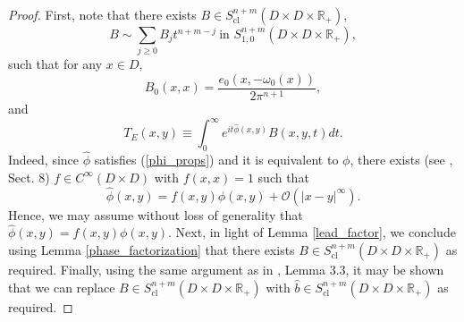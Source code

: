 \documentclass{article}
\newcommand{\RR}{\mathbb R}
\newcommand{\mco}{\mathcal O}
\DeclareMathOperator{\cl}{cl}
\begin{document}
% 
\begin{proof}
First, note that there exists $B \in S^{n+m}_{\cl}(D \times D \times \RR_+)$, $$B \sim \sum_{j \ge 0} B_j t^{n+m-j}\ \text{in } S^{n+m}_{1,0}(D \times D \times \RR_+),$$
such that for any $x \in D$, $$B_0(x,x) = \frac{e_0(x, -\omega_0(x))}{2\pi^{n+1}},$$
and $$T_E(x,y) \equiv \int_0^\infty e^{it \hat \phi(x,y)} B(x,y,t) dt.$$
Indeed, since $\hat \phi$ satisfies (\ref{phi_props}) and it is equivalent to $\phi$, there exists (see \cite{hsiaomari2}, Sect. 8) $f \in C^\infty(D \times D)$ with $f(x,x) = 1$ such that $$\hat \phi(x,y) = f(x,y) \phi(x,y) + \mco(|x-y|^\infty).$$ Hence, we may assume without loss of generality that $\hat \phi(x,y) = f(x,y) \phi(x,y)$. Next, in light of Lemma \ref{lead_factor}, we conclude using Lemma \ref{phase_factorization} that there exists $B \in S^{n+m}_{\cl}(D \times D \times \RR_+)$ as required. Finally, using the same argument as in \cite{hsiao_shen}, Lemma 3.3, it may be shown that we can replace $B \in S^{n+m}_{\cl}(D \times D \times \RR_+)$ with $\hat b \in S^{n+m}_{\cl}(D \times D \times \RR_+)$ as required.
\end{proof}
%
%
%
\end{document}
